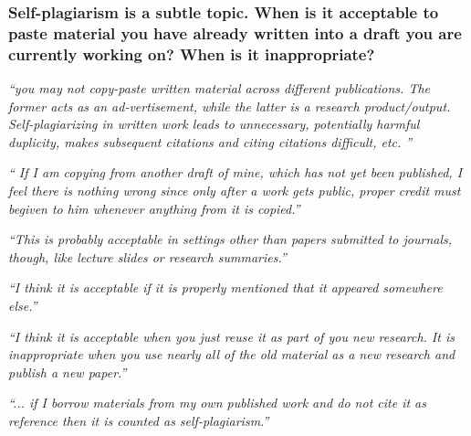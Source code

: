 \documentclass[12pt]{beamer}
\newcommand\ans[1]{{\it ``#1''}}
\newcommand\gap{\vspace{5mm}}
\begin{document}
\begin{frame}  %
  \frametitle{ Self-plagiarism is a subtle topic. When is it acceptable to paste material you have already written into a draft you are currently working on? When is it inappropriate?
}

\ans{you may not copy-paste written material across different publications.  The former acts as an ad-vertisement, while the latter is a research product/output.  Self-plagiarizing in written work leads to unnecessary, potentially harmful duplicity, makes subsequent citations and citing citations difficult, etc. }

\gap

\ans{ If I am copying from another draft of mine, which has not yet been published, I feel there is nothing wrong since only after a work gets public, proper credit must begiven to him whenever anything from it is copied.}


\ans{This is probably acceptable  in  settings  other  than  papers  submitted  to  journals,  though,  like  lecture slides or research summaries.}

\ans{I think it is acceptable if it is properly mentioned that it appeared somewhere else.}

\ans{I  think  it  is  acceptable  when  you  just  reuse  it  as  part  of  you  new  research.   It  is inappropriate when you use nearly all of the old material as a new research and publish a new paper.}

\ans{... if I borrow materials from my own published work and do not cite it as reference then it is counted as self-plagiarism.}

\end{frame}
\end{document}
